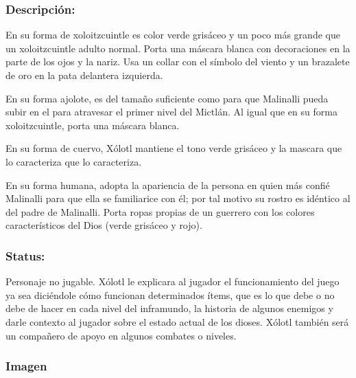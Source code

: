 \documentclass[11pt,letterpaper]{article}
\begin{document}
\subsubsection{Descripción:}
En su forma de xoloitzcuintle es color verde grisáceo y un poco más grande que un xoloitzcuintle adulto normal. Porta una máscara blanca con decoraciones en la parte de los ojos y la nariz. Usa un collar con el símbolo del viento y un brazalete de oro en la pata delantera izquierda.
\\ 
\par
En su forma ajolote, es del tamaño suficiente como para que Malinalli pueda subir en el para atravesar el primer nivel del Mictlán. Al igual que en su forma xoloitzcuintle, porta una máscara blanca.
\\ 
\par
En su forma de cuervo, Xólotl mantiene el tono verde grisáceo y la mascara que lo caracteriza que lo caracteriza.
\\ 
\par
En su forma humana, adopta la apariencia de la persona en quien más confié Malinalli para que ella se familiarice con él; por tal motivo su rostro es idéntico al del padre de Malinalli. Porta ropas propias de un guerrero con los colores característicos del Dios (verde grisáceo y rojo). 
\subsubsection{Status:}
Personaje no jugable.
Xólotl le explicara al jugador el funcionamiento del juego ya sea diciéndole cómo funcionan determinados ítems, que es lo que debe o no debe de hacer en cada nivel del inframundo, la historia de algunos enemigos y darle contexto al jugador sobre el estado actual de los dioses. Xólotl también será un compañero de apoyo en algunos combates o niveles.
\subsubsection{Imagen}
\end{document}
